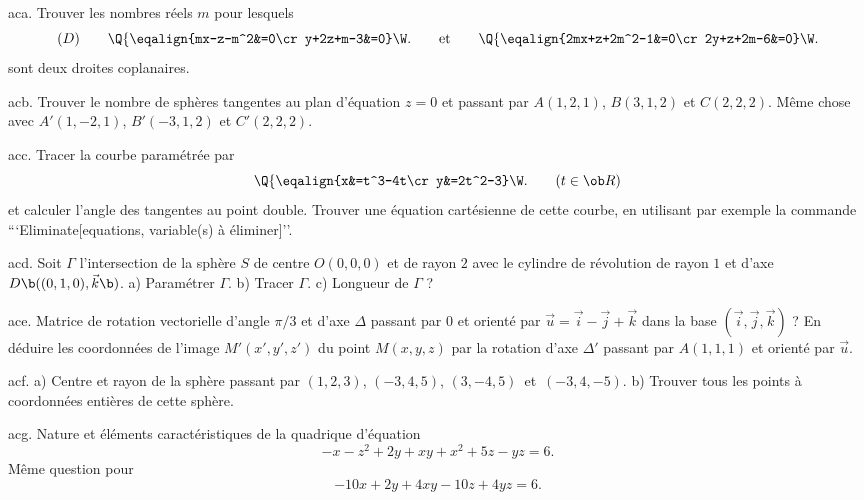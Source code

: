
\exo [Level=1,Fight=1,Learn=1,Field=\GéométrieSpatiale,Type=\Maple,Origin=] aca. 
Trouver les nombres réels $m$ pour lesquels 
$$
(\sc D)\qquad\Q\{\eqalign{mx-z-m^2&=0\cr y+2z+m-3&=0}\W.\qquad\hbox{et}
\qquad\Q\{\eqalign{2mx+z+2m^2-1&=0\cr 2y+z+2m-6&=0}\W.
$$
sont deux droites coplanaires.  

\exo [Level=1,Fight=1,Learn=1,Field=\GéométrieSpatiale,Type=\Maple,Origin=] acb. 
Trouver le nombre de sphères tangentes au plan d'équation $z=0$ 
et passant par $A(1,2,1)$, $B(3,1,2)$ et $C(2,2,2)$. \pn
Même chose avec $A'(1,-2,1)$, $B'(-3,1,2)$ et $C'(2,2,2)$.

\exo [Level=1,Fight=1,Learn=1,Field=\CourbesParamétréesCartésiennes,Type=\Maple,Origin=] acc. 
Tracer la courbe paramétrée par 
$$\Q\{
\eqalign{x&=t^3-4t\cr
y&=2t^2-3} \W.\qquad(t\in\ob R)
$$
et calculer l'angle des tangentes au point double. Trouver une équation cartésienne de cette courbe,  
en utilisant par exemple la commande ```Eliminate[equations, variable(s) à éliminer]''.
 
\exo [Level=2,Fight=1,Learn=1,Field=\GéométrieSpatiale,Type=\Maple,Origin=] acd. 
Soit $\Gamma$ l'intersection de la sphère $S$ de centre $O(0,0,0)$ et de rayon $2$ avec le cylindre de révolution de rayon $1$ 
et d'axe $\sc D\b((0,1,0),\vec{k}\b)$. \pn
a) Paramétrer $\Gamma$. \pn
b) Tracer $\Gamma$.\pn 
c) Longueur de $\Gamma$ ?

\exo [Level=2,Fight=1,Learn=1,Field=\MatricesOrthogonales,Type=\Maple,Origin=] ace. 
Matrice de rotation vectorielle d'angle $\pi/3$ et d'axe $\Delta$ passant par $0$ et orienté par $\vec u=\vec i-\vec j+\vec k$ dans la base $(\vec i,\vec j,\vec k)$ ?\pn
En déduire les coordonnées de l'image $M'(x',y',z')$ du point $M(x,y,z)$ par la rotation d'axe $\Delta'$  passant par $A(1,1,1)$ 
et orienté par $\vec u$. 

\exo [Level=1,Fight=1,Learn=1,Field=\GéométrieSpatiale,Type=\Maple,Origin=,Indication={On pourra tester si les points $(x,y,z)\in\ob Z^3$ vérifiant $-20\le x,y,z\le 20$ appartiennent à la sphère à l'aide d'une triple boucle emboitée}] acf. 
a) Centre et rayon de la sphère passant par $(1,2,3)$, $(-3,4,5)$, $(3,-4,5)$~et~$(-3,4,-5)$. \pn
b) Trouver tous les points à coordonnées entières de cette sphère. 

\exo [Level=2,Fight=0,Learn=0,Field=\Quadriques,Type=\Maple,Origin=] acg. 
Nature et éléments caractéristiques de la quadrique d'équation $$
-x-z^2+2y+xy+x^2+5z-yz=6.
$$ 
Même question pour 
$$
-10x+2y+4xy-10z+4yz=6.
$$
\par

